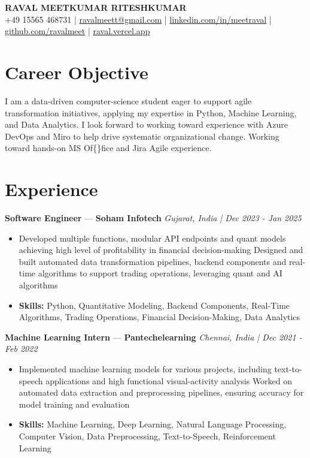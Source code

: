 \documentclass[a4paper,10pt]{article}
\begin{document}
\begin{center}
  {\Large\bfseries RAVAL MEETKUMAR RITESHKUMAR}\\[2pt]
  {\small +49 15565 468731 \;|\; \href{mailto:ravalmeett@gmail.com}{ravalmeett@gmail.com} \;|\; \href{https://www.linkedin.com/in/meetraval/}{linkedin.com/in/meetraval} \;|\; \href{https://github.com/ravalmeet}{github.com/ravalmeet} \;|\; \href{https://raval.vercel.app/}{raval.vercel.app}}
\end{center}
\vspace{-3pt}

\section*{Career Objective}
I am a data-driven computer-science student eager to support agile transformation initiatives, applying my expertise in Python, Machine Learning, and Data Analytics. I look forward to working toward experience with Azure DevOps and Miro to help drive systematic organizational change. Working toward hands-on MS Of\{\}fice and Jira Agile experience.\par

\section*{Experience}
\textbf{Software Engineer} — \textbf{Soham Infotech} \hfill \textit{Gujarat, India \;|\; Dec 2023 - Jan 2025}\par
\vspace{1pt}
\begin{itemize}
  \item Developed multiple functions, modular API endpoints and quant models achieving high level of profitability in financial decision-making Designed and built automated data transformation pipelines, backend components and real-time algorithms to support trading operations, leveraging quant and AI algorithms
  \item \textbf{Skills:} Python, Quantitative Modeling, Backend Components, Real-Time Algorithms, Trading Operations, Financial Decision-Making, Data Analytics
\end{itemize}
\vspace{3pt}
\textbf{Machine Learning Intern} — \textbf{Pantechelearning} \hfill \textit{Chennai, India \;|\; Dec 2021 - Feb 2022}\par
\vspace{1pt}
\begin{itemize}
  \item Implemented machine learning models for various projects, including text-to-speech applications and high functional visual-activity analysis Worked on automated data extraction and preprocessing pipelines, ensuring accuracy for model training and evaluation
  \item \textbf{Skills:} Machine Learning, Deep Learning, Natural Language Processing, Computer Vision, Data Preprocessing, Text-to-Speech, Reinforcement Learning
\end{itemize}
\end{document}
